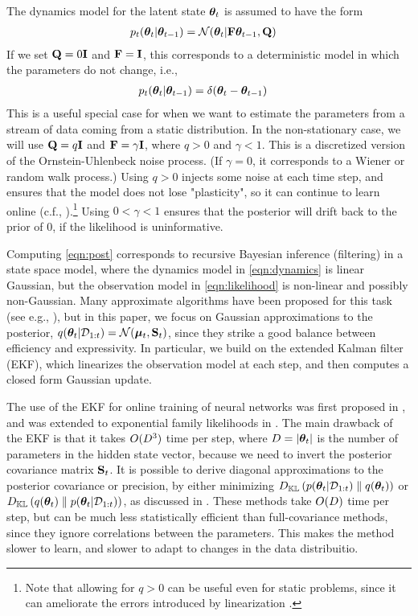The dynamics model for  the latent state ${\bm{\theta}}_t$
is assumed to have the form 
\begin{align}
p_t({\bm{\theta}}_t|{\bm{\theta}}_{t-1}) &= 
\mathcal{N}({\bm{\theta}}_t  | \mathbf{F} {\bm{\theta}}_{t-1}, \mathbf{Q})
\label{eqn:dynamics}
\end{align}
If we set $\mathbf{Q} = 0 \mathbf{I}$ and $\mathbf{F}=\mathbf{I}$, this corresponds to a deterministic model in which the parameters do not change, i.e., 
\begin{align}
p_t({\bm{\theta}}_t|{\bm{\theta}}_{t-1}) &= 
\delta({\bm{\theta}}_t  - {\bm{\theta}}_{t-1}) \label{eq:stationary}
\end{align}
This is a useful special case for when we want to estimate the parameters from a stream of data coming from
a static distribution.
In the non-stationary case, 
we will use $\mathbf{Q} = q \mathbf{I}$ and $\mathbf{F} = \gamma \mathbf{I}$,
where $q >0$ and $\gamma<1$.
This  is a discretized version
of the Ornstein-Uhlenbeck noise process.
(If $\gamma=0$, it corresponds to a Wiener or random
walk process.)
Using $q>0$ injects some noise at each time step,
and ensures that the model does not lose
"plasticity", so it can continue to learn online (c.f., \citep{Ash2020,Dohare2021}).\footnote{
%
Note that allowing for $q>0$
can be useful even for static problems,
since it can ameliorate the errors
introduced by linearization \citep{Barrau2018}.
}
Using $0 < \gamma < 1$ ensures that
the posterior will drift back to the prior of 0,
if the  likelihood is uninformative.

Computing \cref{eqn:post}
corresponds to recursive Bayesian inference (filtering)
in a state space model,
where the
dynamics model
in \cref{eqn:dynamics}
is linear Gaussian,
but the observation model
in \cref{eqn:likelihood}
is
non-linear and possibly non-Gaussian.
Many approximate algorithms have been proposed
for this task (see e.g.,  \citep{Sarkka23,pml2Book}),
but in this paper, we focus on Gaussian approximations
to the posterior, $q({\bm{\theta}}_t|{\mathcal{D}}_{1:t}) =\mathcal{N}(\boldsymbol{\mu}_t,\mathbf{S}_t)$,
since they strike a good balance between 
efficiency and expressivity.
In particular, we build on the extended
Kalman filter (EKF), which linearizes the observation model at each step, and then computes a closed form Gaussian update.

The use of the EKF for online training of neural networks
was first proposed in \citep{Singhal1988},
and was extended to exponential family likelihoods
in \citep{Ollivier2018,Tronarp2018}.
The main drawback of the EKF is that it takes $O(D^3)$ time per step,
where $D = |{\bm{\theta}}_t|$ is the number of parameters in the hidden  state vector,
because we need to invert the posterior covariance matrix $\mathbf{S}_t$.
It is possible to derive diagonal approximations to the posterior covariance or precision,
by either minimizing 
$D_{\mathbb{KL}}\left({p({\bm{\theta}}_t|{\mathcal{D}}_{1:t})} \mathrel{\|} {q({\bm{\theta}}_t)}\right)$
or
$D_{\mathbb{KL}}\left({q({\bm{\theta}}_t)} \mathrel{\|} {p({\bm{\theta}}_t|{\mathcal{D}}_{1:t})}\right)$,
as discussed in \citep{Puskorius1991,Chang2022}.
These methods take $O(D)$ time per step,
but can be much less statistically efficient
than full-covariance methods, since they ignore
correlations between the parameters.
This makes the method slower to learn,
and slower to adapt to changes in the data distribuitio.

